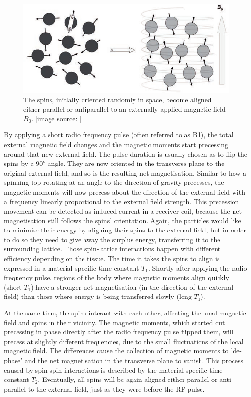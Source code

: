 \begin{figure}[h!]
\centering
\includegraphics[width=0.8\linewidth]{../fig/intro/spin_align}
\caption{The spins, initially oriented randomly in space, become aligned either parallel or antiparallel to an externally applied magnetic field $B_0$. [image source: \cite{Maidment2014}]}
\label{fig:spin_align}
\end{figure}

By applying a short radio frequency pulse (often referred to as B1), the total external magnetic field changes and the magnetic moments start precessing around that new external field.
The pulse duration is usually chosen as to flip the spins by a $90^o$ angle.
They are now oriented in the transverse plane to the original external field, and so is the resulting net magnetisation.
Similar to how a spinning top rotating at an angle to the direction of gravity precesses, the magnetic moments will now precess about the direction of the external field with a frequency linearly proportional to the external field strength.
This precession movement can be detected as induced current in a receiver coil, because the net magnetisation still follows the spins' orientation. 
Again, the particles would like to minimise their energy by aligning their spins to the external field, but in order to do so they need to give away the surplus energy, transferring it to the surrounding lattice.
Those spin-lattice interactions happen with different efficiency depending on the tissue.
The time it takes the spins to align is expressed in a material specific time constant $T_1$.
Shortly after applying the radio frequency pulse, regions of the body where magnetic moments align quickly (short $T_1$) have a stronger net magnetisation (in the direction of the external field) than those where energy is being transferred slowly (long $T_1$).

At the same time, the spins interact with each other, affecting the local magnetic field and spins in their vicinity.
The magnetic moments, which started out precessing in phase directly after the radio frequency pulse flipped them, will precess at slightly different frequencies, due to the small fluctuations of the local magnetic field.
The differences cause the collection of magnetic moments to 'de-phase' and the net magnetisation in the transverse plane to vanish.
This process caused by spin-spin interactions is described by the material specific time constant $T_2$.
Eventually, all spins will be again aligned either parallel or anti-parallel to the external field, just as they were before the RF-pulse.

